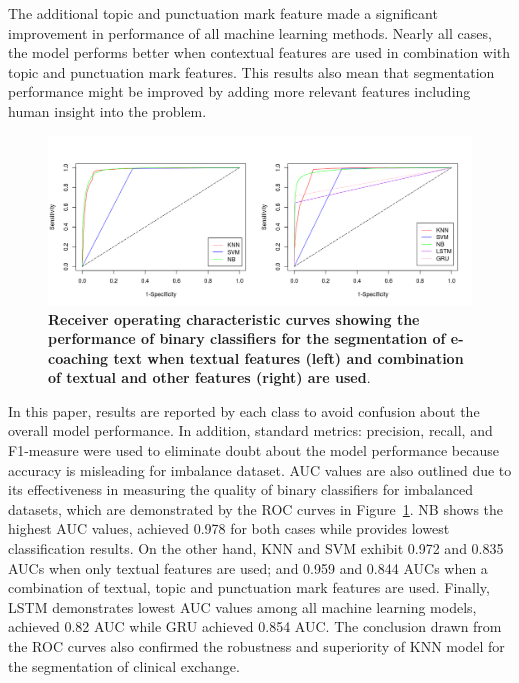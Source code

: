\documentclass{amia}
\begin{document}
The additional topic and punctuation mark feature made a significant improvement in performance of all machine learning methods. Nearly all cases, the model performs better when contextual features are used in combination with topic and punctuation mark features. This results also mean that segmentation performance might be improved by adding more relevant features including human insight into the problem.       

\begin{figure}[!htb]
    \centering
    \includegraphics[width=1.0\textwidth]{figures/roc-curves.png}
    \caption{\textbf{Receiver operating characteristic curves showing the performance of binary classifiers for the segmentation of e-coaching text when textual features (left) and combination of textual and other features (right) are used}.}
    \label{fig:roc-curves}
\end{figure}

In this paper, results are reported by each class to avoid confusion about the overall model performance. In addition, standard metrics: precision, recall, and F1-measure were used to eliminate doubt about the model performance because accuracy is misleading for imbalance dataset. AUC values are also outlined due to its effectiveness in measuring the quality of binary classifiers for imbalanced datasets\cite{hu2015kernelized}, which are demonstrated by the ROC curves in Figure~\ref{fig:roc-curves}. NB shows the highest AUC values, achieved 0.978 for both cases while provides lowest classification results. On the other hand, KNN and SVM exhibit 0.972 and 0.835 AUCs when only textual features are used; and 0.959 and 0.844 AUCs when a combination of textual, topic and punctuation mark features are used. Finally, LSTM demonstrates lowest AUC values among all machine learning models, achieved 0.82 AUC while GRU achieved 0.854 AUC. The conclusion drawn from the ROC curves also confirmed the robustness and superiority of KNN model for the segmentation of clinical exchange.      
\end{document}

